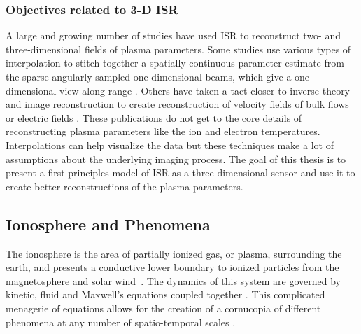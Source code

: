 \subsubsection{Objectives related to 3-D ISR}
A large and growing number of studies have used ISR to reconstruct two- and three-dimensional fields of plasma parameters. Some studies use various types of interpolation to stitch together a spatially-continuous parameter estimate from the sparse angularly-sampled one dimensional beams, which give a one dimensional view along range \cite{Semeter2009738,Butler:2013ul,Semeter:2005fo}. Others have taken a tact closer to inverse theory and image reconstruction to create reconstruction of velocity fields of bulk flows or electric fields \cite{butler:imagingfregiondrifts,RDS:RDS20195}. These publications do not get to the core details of reconstructing plasma parameters like the ion and electron temperatures. Interpolations can help visualize the data but these techniques make a lot of assumptions about the underlying imaging process. The goal of this thesis is to present a first-principles model of ISR as a three dimensional sensor and use it to create better reconstructions of the plasma parameters.
%
%

\subsection{Ionosphere and Phenomena}
The ionosphere is the area of partially ionized gas, or plasma, surrounding the earth, and presents a conductive lower boundary to ionized particles from the magnetosphere and solar wind~\cite{kellybook}. The dynamics of this system are governed by kinetic, fluid and Maxwell's equations coupled together \cite{schunk2004ionospheres}. This complicated menagerie of equations allows for the creation of a cornucopia of different phenomena at any number of spatio-temporal scales \cite{Semeter:2008hs,Semeter2009738}.


